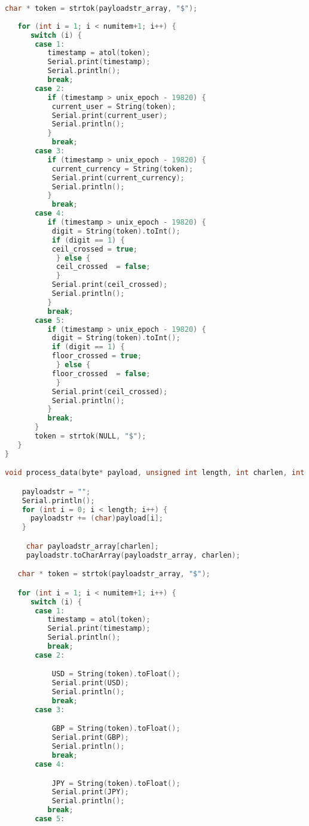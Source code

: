\begin{lstlisting}[language=C++]
   char * token = strtok(payloadstr_array, "$");
   
   for (int i = 1; i < numitem+1; i++) {
      switch (i) {
       case 1:
          timestamp = atol(token);
          Serial.print(timestamp);
          Serial.println();
          break;
       case 2:
          if (timestamp > unix_epoch - 19820) {
           current_user = String(token);
           Serial.print(current_user);
           Serial.println();
          }
           break;
       case 3:
          if (timestamp > unix_epoch - 19820) {
           current_currency = String(token);
           Serial.print(current_currency);
           Serial.println();
          }
           break;
       case 4:
          if (timestamp > unix_epoch - 19820) {
           digit = String(token).toInt();
           if (digit == 1) {
           ceil_crossed = true;
            } else {
            ceil_crossed  = false;
            }
           Serial.print(ceil_crossed);
           Serial.println();
          }
          break;
       case 5:
          if (timestamp > unix_epoch - 19820) {
           digit = String(token).toInt();
           if (digit == 1) {
           floor_crossed = true;
            } else {
           floor_crossed  = false;
            }
           Serial.print(ceil_crossed);
           Serial.println();
          }
          break;    
       }
       token = strtok(NULL, "$");
   }
}

void process_data(byte* payload, unsigned int length, int charlen, int numitem) {

    payloadstr = "";
    Serial.println();
    for (int i = 0; i < length; i++) {
      payloadstr += (char)payload[i];
    }

     char payloadstr_array[charlen];
     payloadstr.toCharArray(payloadstr_array, charlen);

   char * token = strtok(payloadstr_array, "$");

   for (int i = 1; i < numitem+1; i++) {
      switch (i) {
       case 1:
          timestamp = atol(token);
          Serial.print(timestamp);
          Serial.println();
          break;
       case 2:

           USD = String(token).toFloat();
           Serial.print(USD);
           Serial.println();
           break;
       case 3:

           GBP = String(token).toFloat();
           Serial.print(GBP);
           Serial.println();
           break;
       case 4:

           JPY = String(token).toFloat();
           Serial.print(JPY);
           Serial.println();
          break;
       case 5:


\end{lstlisting}
